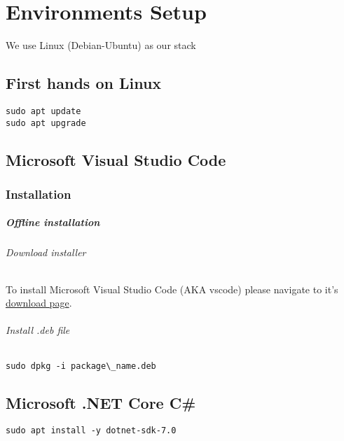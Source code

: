 \chapter{Environments Setup}

We use Linux (Debian-Ubuntu) as our stack


\section{First hands on Linux}

\begin{verbatim}
sudo apt update
sudo apt upgrade
\end{verbatim}

\section{Microsoft Visual Studio Code}

\subsection{Installation}

\paragraph{Offline installation}

\subparagraph{Download installer}

To install Microsoft Visual Studio Code (AKA vscode) please navigate to it's \href{https://code.visualstudio.com}{download page}.

\subparagraph{Install .deb file}

\begin{verbatim}
sudo dpkg -i package\_name.deb
\end{verbatim}

\section{Microsoft .NET Core C\#}

\begin{verbatim}
sudo apt install -y dotnet-sdk-7.0
\end{verbatim}